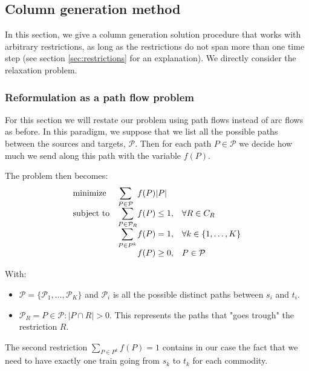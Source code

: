 \documentclass[14pt,a4paper]{article}
\theoremstyle{definition}
\numberwithin{equation}{subsection}
\begin{document}
\subsection{Column generation method}

In this section, we give a column generation solution procedure that works with arbitrary restrictions, as long as the restrictions do not span more than one time step (see section \ref*{sec:restrictions} for an explanation). We directly consider the relaxation problem.

\subsubsection{Reformulation as a path flow problem}


For this section we will restate our problem using path flows instead of arc flows as before. In this paradigm, we suppose that we list all the possible paths between the sources and targets, $\mathcal{P}$. Then for each path $P \in \mathcal{P}$ we decide how much we send along this path with the variable $f(P)$.


 The problem then becomes: 
\begin{equation}
	\begin{array}{ll@{}ll}
		\text{minimize}  & \displaystyle\sum\limits_{P \in \mathcal{P}} &f(P)|P| &\\
		\text{subject to}& \displaystyle\sum\limits_{P \in \mathcal{P}_R}   &f(P) \leq 1,  &\forall R \in C_R\\
	& \displaystyle\sum\limits_{P \in P^k}   &f(P) = 1,  &\forall k \in \{1,\ldots,K\}\\
		&                                                &f(P) \geq 0, &P\in \mathcal{P}
	\end{array}
\label{eq:pathFormulationPrimal}
\end{equation}

With: 
\begin{itemize}
	\item $\mathcal{P} = \{\mathcal{P}_1,\ldots,\mathcal{P}_K\}$ and $\mathcal{P}_i$ is all the possible distinct paths between $s_i$ and $t_i$.
	\item $\mathcal{P}_R = {P \in \mathcal{P}: |P\cap R| > 0 }$. This represents the paths that "goes trough" the restriction $R$.
\end{itemize}

The second restriction $\sum_{P \in P^k} f(P) = 1$ contains in our case the fact that we need to have exactly one train going from $s_k$ to $t_k$ for each commodity.
\end{document}
